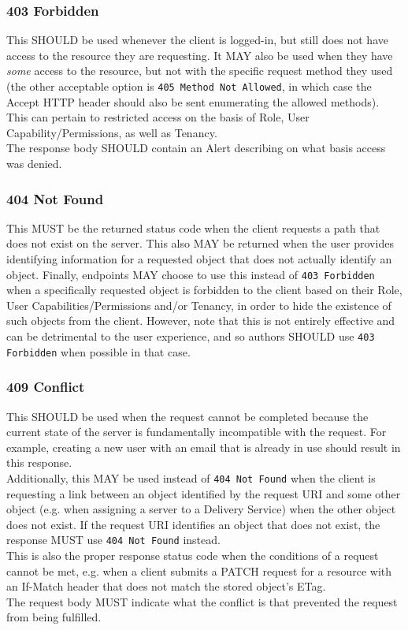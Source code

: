 \documentclass{article}
\newcommand{\code}[1]{\texttt{\color{inlinecodecolor}#1}}
\begin{document}
\subsubsection{403 Forbidden\label{sec:403}}
This SHOULD be used whenever the client is logged-in, but still does not have access to the resource they are requesting. It MAY also be used when they
have \emph{some} access to the resource, but not with the specific request method they used (the other acceptable option is \code{405 Method Not Allowed},
in which case the Accept HTTP header should also be sent enumerating the allowed methods).\\
This can pertain to restricted access on the basis of Role, User Capability/Permissions, as well as Tenancy.\\
The response body SHOULD contain an Alert describing on what basis access was denied.

\subsubsection{404 Not Found\label{sec:404}}
This MUST be the returned status code when the client requests a path that does not exist on the server. This also MAY be returned when the user provides
identifying information for a requested object that does not actually identify an object. Finally, endpoints MAY choose to use this instead of
\code{403 Forbidden} when a specifically requested object is forbidden to the client based on their Role, User Capabilities/Permissions and/or Tenancy, in
order to hide the existence of such objects from the client. However, note that this is not entirely effective and can be detrimental to the user experience,
and so authors SHOULD use \code{403 Forbidden} when possible in that case.

\subsubsection{409 Conflict}
This SHOULD be used when the request cannot be completed because the current state of the server is fundamentally incompatible with the request. For example,
creating a new user with an email that is already in use should result in this response.\\
Additionally, this MAY be used instead of \code{404 Not Found} when the client is requesting a link between an object identified by the request URI and some
other object (e.g. when assigning a server to a Delivery Service) when the other object does not exist. If the request URI identifies an object that does not
exist, the response MUST use \code{404 Not Found} instead.\\
This is also the proper response status code when the conditions of a request cannot be met, e.g. when a client submits a PATCH request for a resource with an
If-Match header that does not match the stored object's ETag.\\
The request body MUST indicate what the conflict is that prevented the request from being fulfilled.
\end{document}
